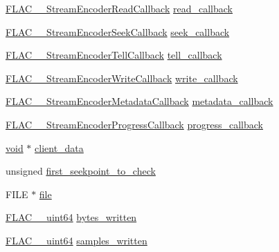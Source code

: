 \begin{DoxyCompactItemize}
\hyperlink{group__flac__stream__encoder_ga18b7941b93bae067192732e913536d44}{F\+L\+A\+C\+\_\+\+\_\+\+Stream\+Encoder\+Read\+Callback} \hyperlink{struct_f_l_a_c_____stream_encoder_private_a6009c55a758c32218403c5ade2037424}{read\+\_\+callback}
\item 
\hyperlink{group__flac__stream__encoder_ga70b85349d5242e4401c4d8ddf6d9bbca}{F\+L\+A\+C\+\_\+\+\_\+\+Stream\+Encoder\+Seek\+Callback} \hyperlink{struct_f_l_a_c_____stream_encoder_private_ae2d302c3de63f9387544eb69c85d9e2b}{seek\+\_\+callback}
\item 
\hyperlink{group__flac__stream__encoder_gabefdf2279e1d0347d9f98f46da4e415b}{F\+L\+A\+C\+\_\+\+\_\+\+Stream\+Encoder\+Tell\+Callback} \hyperlink{struct_f_l_a_c_____stream_encoder_private_a2fb298c9b4322a2d607e87765297a94b}{tell\+\_\+callback}
\item 
\hyperlink{group__flac__stream__encoder_ga50865125fd57c40fab6eb2f062651429}{F\+L\+A\+C\+\_\+\+\_\+\+Stream\+Encoder\+Write\+Callback} \hyperlink{struct_f_l_a_c_____stream_encoder_private_adff3aedd71c00bfea23007b1d3744b27}{write\+\_\+callback}
\item 
\hyperlink{group__flac__stream__encoder_ga091fbf3340d85bcbda1090c31bc320cf}{F\+L\+A\+C\+\_\+\+\_\+\+Stream\+Encoder\+Metadata\+Callback} \hyperlink{struct_f_l_a_c_____stream_encoder_private_ab3331280f777a0f9e4187b4342df37d1}{metadata\+\_\+callback}
\item 
\hyperlink{group__flac__stream__encoder_ga6e051c0e5837433f9e7cd56cd42ca6ba}{F\+L\+A\+C\+\_\+\+\_\+\+Stream\+Encoder\+Progress\+Callback} \hyperlink{struct_f_l_a_c_____stream_encoder_private_a2d0d14c9fa4aefd3be107a7ee747cf15}{progress\+\_\+callback}
\item 
\hyperlink{sound_8c_ae35f5844602719cf66324f4de2a658b3}{void} $\ast$ \hyperlink{struct_f_l_a_c_____stream_encoder_private_a76da66f023007d374d0a87b61ccb24be}{client\+\_\+data}
\item 
unsigned \hyperlink{struct_f_l_a_c_____stream_encoder_private_a6b1354dc12ac51e43d467cad8a7883c8}{first\+\_\+seekpoint\+\_\+to\+\_\+check}
\item 
F\+I\+LE $\ast$ \hyperlink{struct_f_l_a_c_____stream_encoder_private_a157f407f03c233ab8f66c870b649798d}{file}
\item 
\hyperlink{ordinals_8h_aa78c8c70a3eb8a58af7436f278acde8e}{F\+L\+A\+C\+\_\+\+\_\+uint64} \hyperlink{struct_f_l_a_c_____stream_encoder_private_ad88bd11f9cf2805bdd5388f61352e4ca}{bytes\+\_\+written}
\item 
\hyperlink{ordinals_8h_aa78c8c70a3eb8a58af7436f278acde8e}{F\+L\+A\+C\+\_\+\+\_\+uint64} \hyperlink{struct_f_l_a_c_____stream_encoder_private_a2e54ad1e501e2595a840c6a6f1f72774}{samples\+\_\+written}

\end{DoxyCompactItemize}
